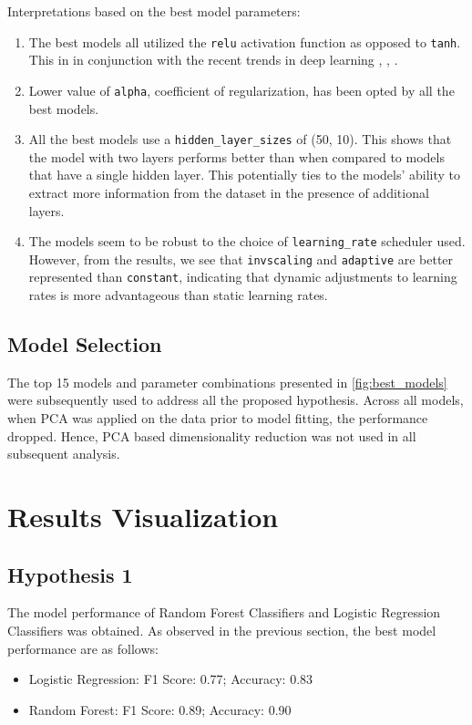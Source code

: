 \documentclass[11pt,a4paper]{article}
\newcommand{\noi}{\noindent}
\begin{document}
\noi
Interpretations based on the best model parameters:
\begin{enumerate}
	\itemsep0em
	\item The best models all utilized the \texttt{relu} activation function as opposed to \texttt{tanh}. This in in conjunction with the recent trends in deep learning \cite{fukushima1980neocognitron}, \cite{nair2010rectified}, \cite{agarap2018deep}.
	\item Lower value of \texttt{alpha}, coefficient of regularization, has been opted by all the best models.
	\item All the best models use a \texttt{hidden\_layer\_sizes} of (50, 10). This shows that the model with two layers performs better than when compared to models that have a single hidden layer. This potentially ties to the models' ability to extract more information from the dataset in the presence of additional layers.
	\item The models seem to be robust to the choice of \texttt{learning\_rate} scheduler used. However, from the results, we see that \texttt{invscaling} and \texttt{adaptive} are better represented than \texttt{constant}, indicating that dynamic adjustments to learning rates is more advantageous than static learning rates.
\end{enumerate}

\subsection{Model Selection}
The top 15 models and parameter combinations presented in \autoref{fig:best_models} were subsequently used to address all the proposed hypothesis. Across all models, when PCA was applied on the data prior to model fitting, the performance dropped. Hence, PCA based dimensionality reduction was not used in all subsequent analysis.


\section{Results Visualization}
\subsection{Hypothesis 1}
The model performance of Random Forest Classifiers and Logistic Regression Classifiers was obtained. As observed in the previous section, the best model performance are as follows:
\begin{itemize}
	\itemsep0em
	\item Logistic Regression: F1 Score: 0.77; Accuracy: 0.83
	\item Random Forest: F1 Score: 0.89; Accuracy: 0.90
\end{itemize}
\end{document}
